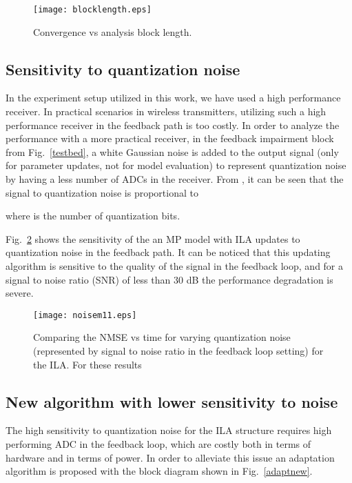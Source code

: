 \documentclass[journal]{IEEEtran}
\begin{document}
\begin{figure}
\centering
\texttt{[image: blocklength.eps]}
\caption{Convergence vs analysis block length.} \label{blocklength}
\end{figure}





\subsection{Sensitivity to quantization noise}
In the experiment setup utilized in this work, we have used a high performance receiver. In practical scenarios in wireless transmitters, utilizing such a high performance receiver in the feedback path is too costly. In order to analyze the performance with a more practical receiver, in the feedback impairment block from Fig.~\ref{testbed}, a white Gaussian noise is added to the output signal (only for parameter updates, not for model evaluation) to represent quantization noise by having a less number of ADCs in the receiver. From \cite[p.~236]{datacompression}, it can be seen that the signal to quantization noise is proportional to

where  is the number of quantization bits.

Fig.~\ref{noise} shows the sensitivity of the an MP model with ILA updates to quantization noise in the feedback path.
It can be noticed that this updating algorithm is sensitive to the quality of the signal in the feedback loop, and for a signal to noise ratio (SNR) of less than 30 dB the performance degradation is severe.


\begin{figure}
\centering
\texttt{[image: noisem11.eps]}
\caption{Comparing the NMSE vs time for varying quantization noise (represented by signal to noise ratio in the feedback loop setting) for the ILA. For these results } \label{noise}
\end{figure}



\subsection{New algorithm with lower sensitivity to noise}
The high sensitivity to quantization noise for the ILA structure requires high performing ADC in the feedback loop, which are costly both in terms of hardware and in terms of power. In order to alleviate this issue an adaptation algorithm is proposed with the block diagram shown in Fig.~\ref{adaptnew}.
\end{document}
